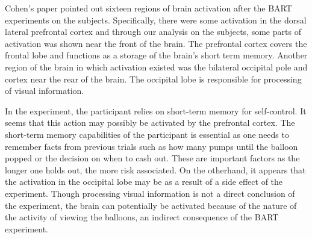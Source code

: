 \par \indent Cohen's paper pointed out sixteen regions of brain activation 
after the BART experiments on the subjects. Specifically, there were some 
activation in the dorsal lateral prefrontal cortex and through our analysis
on the subjects, some parts of activation was shown near the front of the 
brain. The prefrontal cortex covers the frontal lobe and functions as a 
storage of the brain's short term memory. Another region of the brain in which 
activation existed was the bilateral occipital pole and cortex near the rear 
of the brain. The occipital lobe is responsible for processing of visual 
information.

\par In the experiment, the participant relies on short-term memory for 
self-control. It seems that this action may possibly be activated by the 
prefrontal cortex. The short-term memory capabilities of the participant is 
essential as one needs to remember facts from previous trials such as how many 
pumps until the balloon popped or the decision on when to cash out. These are
important factors as the longer one holds out, the more risk associated. On the 
otherhand, it appears that the activation in the occipital lobe may be as a 
result of a side effect of the experiment. Though processing visual information 
is not a direct conclusion of the experiment, the brain can potentially be 
activated because of the nature of the activity of viewing the balloons, an 
indirect consequence of the BART experiment. 
 
